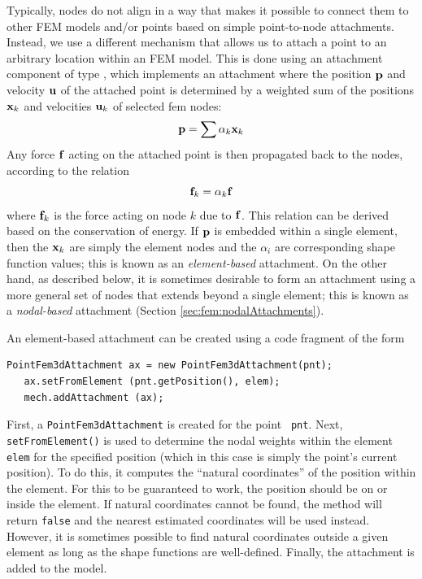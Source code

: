 Typically, nodes do not align in a way that makes it
possible to connect them to other FEM models and/or points based on
simple point-to-node attachments.  Instead, we use a different
mechanism that allows us to attach a point to an arbitrary location
within an FEM model. This is done using an attachment component of
type
, which
implements an attachment where the position ${\bf p}$ and velocity ${\bf u}$ of the
attached point is determined by a weighted sum of the positions ${\bf x}_k$ 
and velocities ${\bf u}_k$ of selected fem nodes:
%
\begin{equation}
{\bf p} = \sum \alpha_k {\bf x}_k
\label{pointFemAttachment:eqn}
\end{equation}
%
Any force ${\bf f}$ acting on the attached point is then propagated back
to the nodes, according to the relation
%
\begin{equation}
{\bf f}_k = \alpha_k {\bf f}
\label{pointFemForces:eqn}
\end{equation}
%
where ${\bf f}_k$ is the force acting on node $k$ due to ${\bf f}$.  This
relation can be derived based on the conservation of energy.
If ${\bf p}$ is embedded within a single element, then the ${\bf x}_k$ are
simply the element nodes and the $\alpha_i$ are corresponding shape
function values; this is known as an {\it element-based} attachment.
On the other hand, as described below, it is sometimes desirable to
form an attachment using a more general set of nodes that extends
beyond a single element; this is known as a {\it nodal-based}
attachment (Section \ref{sec:fem:nodalAttachments}).

An element-based attachment can be created using a code fragment
of the form
%
\begin{lstlisting}[]
   PointFem3dAttachment ax = new PointFem3dAttachment(pnt);
   ax.setFromElement (pnt.getPosition(), elem);
   mech.addAttachment (ax);
\end{lstlisting}
%
First, a {\tt PointFem3dAttachment} is created for the point {\tt
pnt}. Next, {\tt setFromElement()} is used to determine the nodal
weights within the element {\tt elem} for the specified position
(which in this case is simply the point's current position).  To do
this, it computes the ``natural coordinates'' of the
position within the element. For this to be guaranteed to work, the
position should be on or inside the element. If natural coordinates
cannot be found, the method will return {\tt false} and the nearest
estimated coordinates will be used instead. However, it is
sometimes possible to find natural coordinates outside a given element
as long as the shape functions are well-defined. Finally, the
attachment is added to the model.

